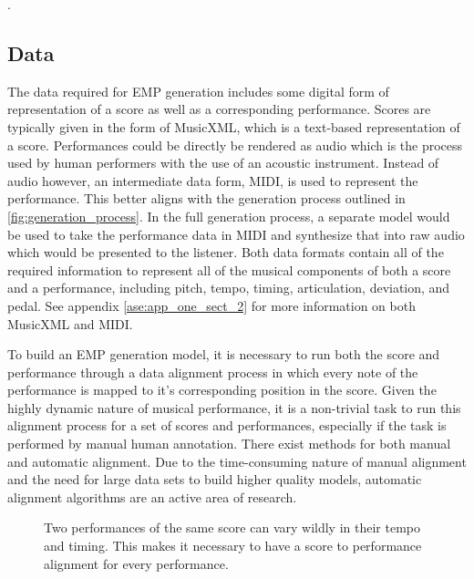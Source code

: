 . 

\subsection{Data}
The data required for EMP generation includes some digital form of representation of a score as well as a corresponding performance. Scores are typically given in the form of MusicXML, which is a text-based representation of a score. Performances could be directly be rendered as audio which is the process used by human performers with the use of an acoustic instrument. Instead of audio however, an intermediate data form, MIDI, is used to represent the performance. This better aligns with the generation process outlined in \ref{fig:generation_process}. In the full generation process, a separate model would be used to take the performance data in MIDI and synthesize that into raw audio which would be presented to the listener. Both data formats contain all of the required information to represent all of the musical components of both a score and a performance, including pitch, tempo, timing, articulation, deviation, and pedal. See appendix \ref{ase:app_one_sect_2} for more information on both MusicXML and MIDI. 

To build an EMP generation model, it is necessary to run both the score and performance through a data alignment process in which every note of the performance is mapped to it's corresponding position in the score. Given the highly dynamic nature of musical performance, it is a non-trivial task to run this alignment process for a set of scores and performances, especially if the task is performed by manual human annotation. There exist methods for both manual and automatic alignment. Due to the time-consuming nature of manual alignment and the need for large data sets to build higher quality models, automatic alignment algorithms are an active area of research. 

\begin{figure}
    \centering
    \caption{Two performances of the same score can vary wildly in their tempo and timing. This makes it necessary to have a score to performance alignment for every performance. }
    \label{fig:alignemnt}
\end{figure}


